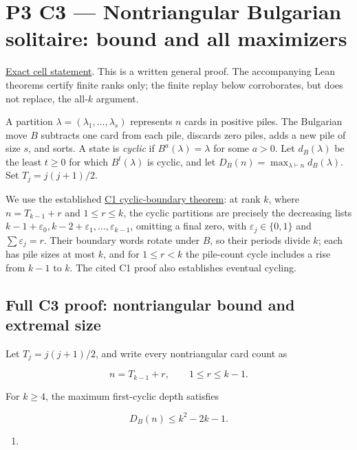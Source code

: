 \documentclass[11pt,a4paper]{article}
\providecommand{\tightlist}{\setlength{\itemsep}{0pt}\setlength{\parskip}{0pt}}
\begin{document}
\section{P3 C3 --- Nontriangular Bulgarian solitaire: bound and all maximizers}\label{p3-c3-nontriangular-bulgarian-solitaire-bound-and-all-maximizers}

\href{https://hackathon.bainsa.ai/p/p3/c3}{Exact cell statement}. This is a written general proof. The accompanying Lean theorems certify finite ranks only; the finite replay below corroborates, but does not replace, the all-\(k\) argument.

A partition \(\lambda=(\lambda_1,\ldots,\lambda_s)\) represents \(n\) cards in positive piles. The Bulgarian move \(B\) subtracts one card from each pile, discards zero piles, adds a new pile of size \(s\), and sorts. A state is \emph{cyclic} if \(B^a(\lambda)=\lambda\) for some \(a>0\). Let \(d_B(\lambda)\) be the least \(t\ge0\) for which \(B^t(\lambda)\) is cyclic, and let \(D_B(n)=\max_{\lambda\vdash n}d_B(\lambda)\). Set \(T_j=j(j+1)/2\).

We use the established \href{https://github.com/mpelteshki/climbing-to-the-frontier/blob/212bba53b1818c08c40b8c4b48f636651eaf6410/cagent/p3/c1/written-proof.md}{C1 cyclic-boundary theorem}: at rank \(k\), where \(n=T_{k-1}+r\) and \(1\le r\le k\), the cyclic partitions are precisely the decreasing lists \(k-1+\varepsilon_0,k-2+\varepsilon_1,\ldots,\varepsilon_{k-1}\), omitting a final zero, with \(\varepsilon_j\in\{0,1\}\) and \(\sum\varepsilon_j=r\). Their boundary words rotate under \(B\), so their periods divide \(k\); each has pile sizes at most \(k\), and for \(1\le r<k\) the pile-count cycle includes a rise from \(k-1\) to \(k\). The cited C1 proof also establishes eventual cycling.

\subsection{Full C3 proof: nontriangular bound and extremal size}\label{full-c3-proof-nontriangular-bound-and-extremal-size}

Let \(T_j=j(j+1)/2\), and write every nontriangular card count as

\[
n=T_{k-1}+r,\qquad 1\le r\le k-1.
\]

For \(k\ge4\), the maximum first-cyclic depth satisfies

\[
D_B(n)\le k^2-2k-1.
\]

\begin{enumerate}
\def\labelenumi{(\Alph{enumi})}
\tightlist
\item
\end{enumerate}
\end{document}
